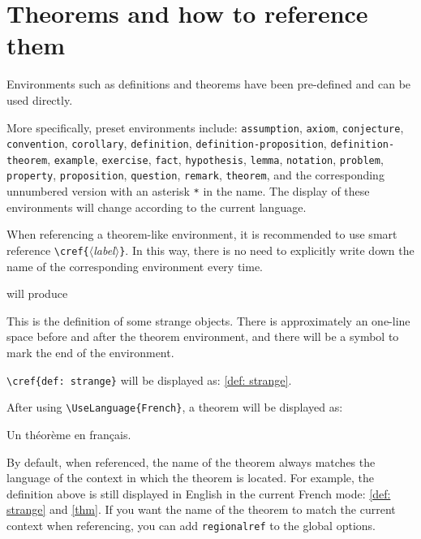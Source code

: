 \documentclass{simplivre}
\providecommand{\meta}[1]{$\langle${\normalfont\itshape#1}$\rangle$}
\newenvironment{remind}[1][Remind]{%
    \LocallyStopLineNumbers%
    \begin{tcolorbox}[breakable,
        enhanced,
        width = \textwidth,
        colback = white, colbacktitle = paper,
        colframe = gray!50, boxrule=0.2mm,
        coltitle = black,
        fonttitle = \sffamily,
        attach boxed title to top left = {yshift=-\tcboxedtitleheight/2,  xshift=\tcboxedtitlewidth/4},
        boxed title style = {boxrule=0pt, colframe=paper},
        before skip = 0.3cm,
        after skip = 0.3cm,
        top = 3mm,
        bottom = 3mm,
        title={\sffamily #1}]%
}{\end{tcolorbox}\ResumeLineNumbers}
\begin{document}
\section{Theorems and how to reference them}

Environments such as definitions and theorems have been pre-defined and can be used directly. 

More specifically, preset environments include: 
\texttt{assumption}, \texttt{axiom}, \texttt{conjecture}, \texttt{convention}, \texttt{corollary}, \texttt{definition}, \texttt{definition-proposition}, \texttt{definition-theorem}, \texttt{example}, \texttt{exercise}, \texttt{fact}, \texttt{hypothesis}, \texttt{lemma}, \texttt{notation}, \texttt{problem}, \texttt{property}, \texttt{proposition}, \texttt{question}, \texttt{remark}, \texttt{theorem}, and the corresponding unnumbered version with an asterisk \lstinline|*| in the name. The display of these environments will change according to the current language.

When referencing a theorem-like environment, it is recommended to use smart reference \lstinline|\cref{|\meta{label}\texttt{\}}. In this way, there is no need to explicitly write down the name of the corresponding environment every time.

\begin{remind}[Example]

\lstinline|\cref{def: strange}| will be displayed as: \cref{def: strange}.

After using \lstinline|\UseLanguage{French}|, a theorem will be displayed as:

\begin{theorem}[Inutile]\label{thm}
    Un théorème en français.
\end{theorem}

By default, when referenced, the name of the theorem always matches the language of the context in which the theorem is located. For example, the definition above is still displayed in English in the current French mode: \cref{def: strange} and \cref{thm}. If you want the name of the theorem to match the current context when referencing, you can add \texttt{regionalref} to the global options.
\end{remind}
\end{document}
